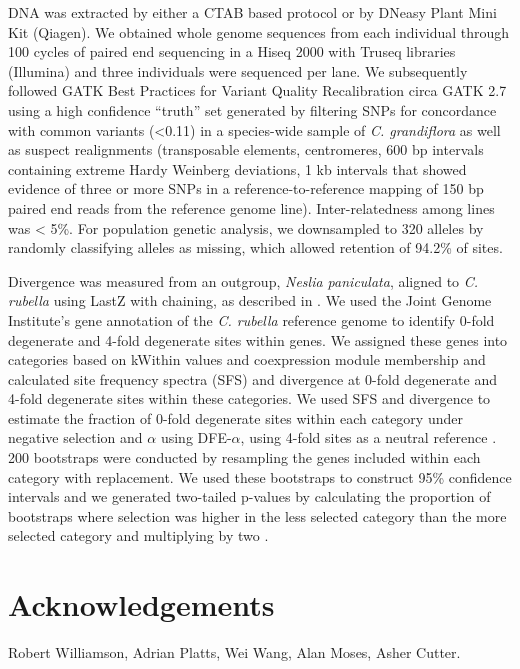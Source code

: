 DNA was extracted by either a CTAB based protocol or by DNeasy Plant Mini Kit (Qiagen). We obtained whole genome sequences from each individual through 100 cycles of paired end sequencing in a Hiseq 2000 with Truseq libraries (Illumina) and three individuals were sequenced per lane. We subsequently followed GATK Best Practices for Variant Quality Recalibration circa GATK 2.7 \citep{DePristo2011-jc} using a high confidence “truth” set generated by filtering SNPs for concordance with common variants (\textless0.11) in a species-wide sample of \textit{C. grandiflora} as well as suspect realignments (transposable elements, centromeres, 600 bp intervals containing extreme Hardy Weinberg deviations, 1 kb intervals that showed evidence of three or more SNPs in a reference-to-reference mapping of 150 bp paired end reads from the reference genome line). Inter-relatedness among lines was < 5\%. For population genetic analysis, we downsampled to 320 alleles by randomly classifying alleles as missing, which allowed retention of 94.2\% of sites.

Divergence was measured from an outgroup, \textit{Neslia paniculata}, aligned to \textit{C. rubella} using LastZ with chaining, as described in \citep{Haudry2013-qe}. We used the Joint Genome Institute’s gene annotation of the \textit{C. rubella} reference genome to identify 0-fold degenerate and 4-fold degenerate sites within genes. We assigned these genes into categories based on kWithin values and coexpression module membership and calculated site frequency spectra (SFS) and divergence at 0-fold degenerate and 4-fold degenerate sites within these categories.  We used SFS and divergence to estimate the fraction of 0-fold degenerate sites within each category under negative selection and $\alpha$ using DFE-$\alpha$, using 4-fold sites as a neutral reference \citep{eyre2009,keightley2007}. 200 bootstraps were conducted by resampling the genes included within each category with replacement. We used these bootstraps to construct 95\% confidence intervals and we generated two-tailed p-values by calculating the proportion of bootstraps where selection was higher in the less selected category than the more selected category and multiplying by two \citep{Eyre-Walker2009-zt}. 



\section{Acknowledgements}
Robert Williamson, Adrian Platts, Wei Wang, Alan Moses, Asher Cutter.

